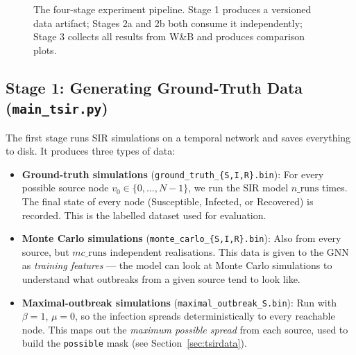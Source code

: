 \begin{figure}[h!]
\caption{The four-stage experiment pipeline. Stage 1 produces a versioned data artifact; Stages 2a and 2b both consume it independently; Stage 3 collects all results from W\&B and produces comparison plots.}
\label{fig:pipeline}
\end{figure}

\subsection{Stage 1: Generating Ground-Truth Data (\texttt{main\_tsir.py})}

The first stage runs SIR simulations on a temporal network and saves everything to disk. It produces three types of data:

\begin{itemize}
    \item \textbf{Ground-truth simulations} (\texttt{ground\_truth\_\{S,I,R\}.bin}): For every possible source node $v_0 \in \{0, \ldots, N-1\}$, we run the SIR model $n\_\text{runs}$ times. The final state of every node (Susceptible, Infected, or Recovered) is recorded. This is the labelled dataset used for evaluation.

    \item \textbf{Monte Carlo simulations} (\texttt{monte\_carlo\_\{S,I,R\}.bin}): Also from every source, but $mc\_\text{runs}$ independent realisations. This data is given to the GNN as \emph{training features} --- the model can look at Monte Carlo simulations to understand what outbreaks from a given source tend to look like.

    \item \textbf{Maximal-outbreak simulations} (\texttt{maximal\_outbreak\_S.bin}): Run with $\beta=1$, $\mu=0$, so the infection spreads deterministically to every reachable node. This maps out the \emph{maximum possible spread} from each source, used to build the \texttt{possible} mask (see Section~\ref{sec:tsirdata}).
\end{itemize}

